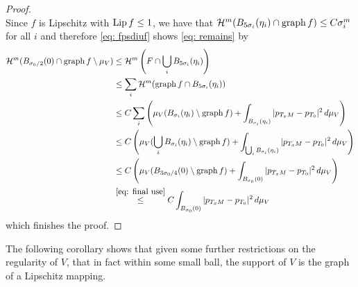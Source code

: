 \begin{proof}
\begin{equation}
\end{equation}
Since $f$ is Lipschitz with $\operatorname{Lip} f \le 1$, we have that $\mathcal{H}^m(B_{5\sigma_i}(\eta_i) \cap \operatorname{graph} f) \le C\sigma_i^m$ for all $i$ and therefore \eqref{eq: fpsdiuf} shows \eqref{eq: remains} by
\begin{align*}
    \mathcal{H}^m( B_{\sigma_0/2}(0) \cap \operatorname{graph} f \setminus \mu_V ) &\le \mathcal{H}^m\left(F \cap \bigcup_i B_{5\sigma_i}(\eta_i)\right) \\
    &\le \sum_i \mathcal{H}^m(\operatorname{graph} f \cap B_{5\sigma_i}(\eta_i)) \\
    &\le C \sum_i \left( \mu_V(B_{\sigma_i}(\eta_i) \setminus \operatorname{graph} f) + \int_{B_{\sigma_i}(\eta_i)} | p_{T_xM} - p_{T_0} |^2\, d\mu_V \right) \\
    &\le C \left( \mu_V(\bigcup_i B_{\sigma_i}(\eta_i) \setminus \operatorname{graph} f) + \int_{\bigcup_i B_{\sigma_i}(\eta_i)} | p_{T_xM} - p_{T_0} |^2\, d\mu_V \right) \\
    &\le C \left( \mu_V( B_{3\sigma_0/4}(0) \setminus \operatorname{graph} f) + \int_{B_{\sigma_0}(0)} | p_{T_xM} - p_{T_0} |^2\, d\mu_V \right) \\
    &\overset{\eqref{eq: final use}}{\le} C\int_{B_{\sigma_0}(0)} | p_{T_xM} - p_{T_0} |^2\, d\mu_V
\end{align*}
which finishes the proof.
\end{proof}

The following corollary shows that given some further restrictions on the regularity of $V$, that in fact within some small ball, the support of $V$ is the graph of a Lipschitz mapping.

